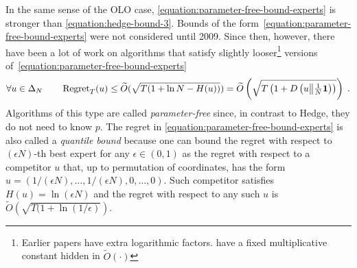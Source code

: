In the same sense of the OLO case, \eqref{equation:parameter-free-bound-experts} is stronger than
\eqref{equation:hedge-bound-3}.
Bounds of the form~\eqref{equation:parameter-free-bound-experts} were not
considered until 2009. Since then, however, there have been a lot of work
\citep{Chaudhuri-Freund-Hsu-2009, Chernov-Vovk-2010, Koolen-van-Erven-2015,
Luo-Schapire-2014, Luo-Schapire-2015, Foster-Rakhlin-Sridharan-2015,
Orabona-Pal-2016-parameter-free} on algorithms that satisfy slightly
looser\footnote{Earlier papers have extra logarithmic factors.
\citet{Foster-Rakhlin-Sridharan-2015, Orabona-Pal-2016-parameter-free} have
a fixed multiplicative constant hidden in $\widetilde
O(\cdot)$} versions of~\eqref{equation:parameter-free-bound-experts}
$$
\forall u \in \Delta_N \qquad \operatorname{Regret}_T(u) \le \widetilde O(\sqrt{T (1 + \ln N - H(u))}) = \widetilde O\left(\sqrt{T \left(1 + D\left({u}\middle\|{\tfrac{1}{N}\mathbf{1}}\right) \right)} \right) \; .
$$
Algorithms of this type are called \emph{parameter-free} since, in contrast to
Hedge, they do not need to know $p$. The regret in
\eqref{equation:parameter-free-bound-experts} is also called a \emph{quantile
bound} because one can bound the regret with respect to $(\epsilon N)$-th best
expert for any $\epsilon \in (0,1)$ as the regret with respect to a competitor
$u$ that, up to permutation of coordinates, has the form $u = \left(
1/(\epsilon N), \dots, 1/(\epsilon N), 0, \dots, 0 \right)$.  Such competitor
satisfies $H(u) = \ln (\epsilon N)$ and the regret with respect to any such $u$
is $\widetilde O(\sqrt{T (1 + \ln(1/\epsilon)})$.
